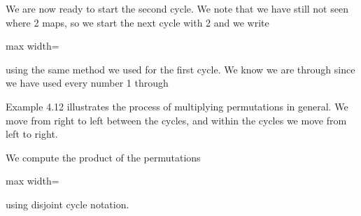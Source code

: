 \documentclass[11pt,oneside]{article}
\begin{document}
\begin{BookBody}
\noindent We are now ready to start the second cycle. We note that we have still not seen where 2 maps, so we start the next cycle with 2 and we write

\begin{center}\begin{adjustbox}{max width=\linewidth}\end{adjustbox}\end{center}

\noindent using the same method we used for the first cycle. We know we are through since we have used every number 1 through \BookEnd{\blacktriangle}

\noindent Example 4.12 illustrates the process of multiplying permutations in general. We move from right to left between the cycles, and within the cycles we move from left to right.

 We compute the product of the permutations

\begin{center}\begin{adjustbox}{max width=\linewidth}\end{adjustbox}\end{center}

\noindent using disjoint cycle notation.

\end{BookBody}

\BookNarrativetrue
\end{document}

